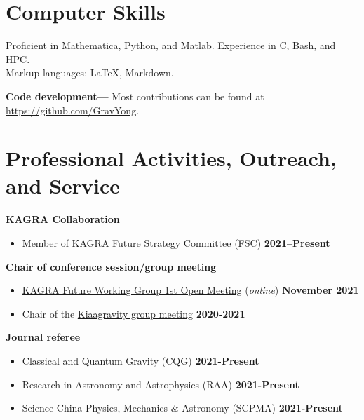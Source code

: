 \documentclass[margin,line]{res}
\begin{document}
\begin{resume}
\section{\sc Computer Skills}
Proficient in {\sc Mathematica}, Python, and Matlab. Experience in C, Bash, and HPC.\\
Markup languages: \LaTeX, Markdown.


{\bf Code development---} Most contributions can be found at \url{https://github.com/GravYong}.

\section{\sc Professional Activities, Outreach, and Service}
{\bf KAGRA Collaboration}
\vspace*{.05in}
\begin{itemize}
\item[] Member of KAGRA Future Strategy Committee (FSC) \hfill{\bf 2021--Present}
\end{itemize}


{\bf Chair of conference session/group meeting}
\vspace*{.05in}
\begin{itemize}
\item[]
\href{https://gwwiki.icrr.u-tokyo.ac.jp/JGWwiki/KAGRA/KSC/FSC/FWG/1stMeeting}{KAGRA Future Working Group 1st Open Meeting} ({\it online}) \hfill {\bf November 2021}
\end{itemize}
\begin{itemize}
  \item[]
  {Chair of the }\href{https://kiaagravity.github.io}{\sc Kiaagravity group meeting}   \hfill {\bf 2020-2021}
  \end{itemize}

{\bf Journal referee}
\vspace*{.05in}
\begin{itemize}
  \item[]
  Classical and Quantum Gravity (CQG)
  \hfill {\bf 2021-Present}
  \item[]
  Research in Astronomy and Astrophysics (RAA)
  \hfill {\bf 2021-Present}
  \item[]
  Science China Physics, Mechanics $\&$ Astronomy (SCPMA)
  \hfill {\bf 2021-Present}
\end{itemize}


\end{resume}
\end{document}

